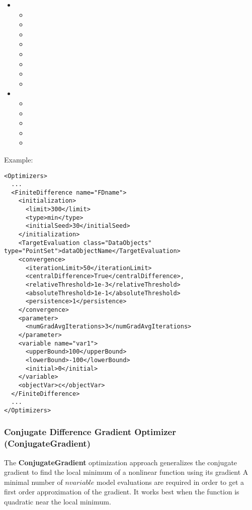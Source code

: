\begin{itemize}
\item \convergence
  \begin{itemize}
  \item \iterationLimit
  \item \persistence
  \item \relativeThreshold
  \item \absoluteThreshold
  \item \minStepSize
  \item \gainGrowthFactor
  \item \gainShrinkFactor
  \item \centralDifference
  \end{itemize}
\item \parameter
  \begin{itemize}
  \item \numGradAvgIterations
  \item \initialStepSize
  \item \perturbationDistance
  \item \innerBisectionThreshold
  \item \innerLoopLimit
  \end{itemize}
\end{itemize}


Example:
\begin{lstlisting}[style=XML]
<Optimizers>
  ...
  <FiniteDifference name="FDname">
    <initialization>
      <limit>300</limit>
      <type>min</type>
      <initialSeed>30</initialSeed>
    </initialization>
    <TargetEvaluation class="DataObjects" type="PointSet">dataObjectName</TargetEvaluation>
    <convergence>
      <iterationLimit>50</iterationLimit>
      <centralDifference>True</centralDifference>,
      <relativeThreshold>1e-3</relativeThreshold>
      <absoluteThreshold>1e-1</absoluteThreshold>
      <persistence>1</persistence>
    </convergence>
    <parameter>
      <numGradAvgIterations>3</numGradAvgIterations>
    </parameter>
    <variable name="var1">
      <upperBound>100</upperBound>
      <lowerBound>-100</lowerBound>
      <initial>0</initial>
    </variable>
    <objectVar>c</objectVar>
  </FiniteDifference>
  ...
</Optimizers>
\end{lstlisting}

\subsubsection{Conjugate Difference Gradient Optimizer (ConjugateGradient)}
\label{subsubsubsec:ConjugateGradient}
The \textbf{ConjugateGradient} optimization approach generalizes the conjugate gradient to find the local minimum
of a nonlinear function using its gradient
A minimal number of $n variable$ model evaluations are required in order to get a first order approximation of the gradient.
It works best when the function is quadratic near the local minimum.

